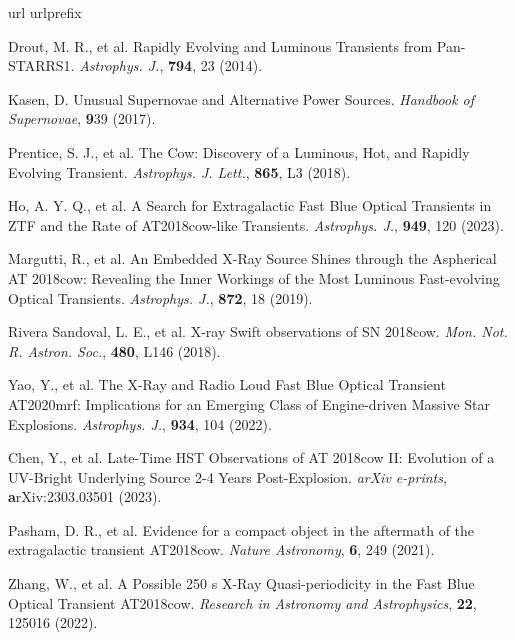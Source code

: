 \documentclass{nature_plusfigure}
\newcommand{\mn}{{Mon. Not. R. Astron. Soc.}}
\newcommand{\mnras}{\mn}
\newcommand{\apj}{{Astrophys. J.}}
\newcommand{\apjl}{{Astrophys. J. Lett.}}
\begin{document}
\begin{thebibliography}{100}
\expandafter\ifx\csname url\endcsname\relax
  \def\url#1{\texttt{#1}}\fi
\expandafter\ifx\csname urlprefix\endcsname\relax\def\urlprefix{URL }\fi
\providecommand{\bibinfo}[2]{#2}
\providecommand{\eprint}[2][]{\url{#2}}



 Drout, M. R., et al. Rapidly Evolving and Luminous Transients from Pan-STARRS1. \emph{\apj}, \textbf{794}, 23 (2014). 

 Kasen, D. Unusual Supernovae and Alternative Power Sources. \emph{Handbook of Supernovae}, \textbf 939 (2017). 

 Prentice, S. J., et al. The Cow: Discovery of a Luminous, Hot, and Rapidly Evolving Transient. \emph{\apjl}, \textbf{865}, L3 (2018). 

 Ho, A. Y. Q., et al. A Search for Extragalactic Fast Blue Optical Transients in ZTF and the Rate of AT2018cow-like Transients. \emph{\apj}, \textbf{949}, 120 (2023). 

 Margutti, R., et al. An Embedded X-Ray Source Shines through the Aspherical AT 2018cow: Revealing the Inner Workings of the Most Luminous Fast-evolving Optical Transients. \emph{\apj}, \textbf{872}, 18 (2019). 

 Rivera Sandoval, L. E., et al. X-ray Swift observations of SN 2018cow. \emph{\mnras}, \textbf{480}, L146 (2018). 

 Yao, Y., et al. The X-Ray and Radio Loud Fast Blue Optical Transient AT2020mrf: Implications for an Emerging Class of Engine-driven Massive Star Explosions. \emph{\apj}, \textbf{934}, 104 (2022). 

 Chen, Y., et al. Late-Time HST Observations of AT 2018cow II: Evolution of a UV-Bright Underlying Source 2-4 Years Post-Explosion. \emph{arXiv e-prints}, \textbf arXiv:2303.03501 (2023). 

 Pasham, D. R., et al. Evidence for a compact object in the aftermath of the extragalactic transient AT2018cow. \emph{Nature Astronomy}, \textbf{6}, 249 (2021). 

 Zhang, W., et al. A Possible 250 s X-Ray Quasi-periodicity in the Fast Blue Optical Transient AT2018cow. \emph{Research in Astronomy and Astrophysics}, \textbf{22}, 125016 (2022). 


\end{thebibliography}
\end{document}
